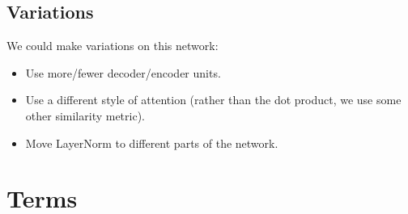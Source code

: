     \phantom{}

    \subsection{Variations}

        We could make variations on this network:

        \begin{itemize}
            \item Use more/fewer decoder/encoder units.
            
            \item Use a different style of attention (rather than the dot product, we use some other similarity metric).

            \item Move LayerNorm to different parts of the network.
        \end{itemize}

\pagebreak

\section{Terms}

